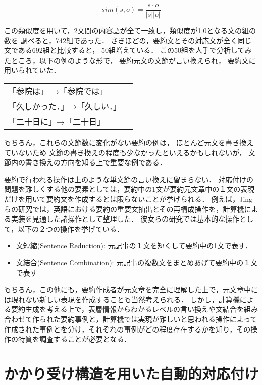 \begin{displaymath}
sim(s,o)=\frac{s \cdot o}{|s||o|}
\end{displaymath}


この類似度を用いて，2文間の内容語が全て一致し，類似度が1.0となる文の組の数を
調べると，742組であった．
さきほどの，要約文とその対応文が全く同じ文である692組と比較すると，
50組増えている．
この50組を人手で分析してみたところ，以下の例のような形で，
要約元文の文節が言い換えられ，
要約文に用いられていた．\\

\begin{center}
\small
\begin{tabular}{lp{}}
「参院は」 →「参院では」\\
「久しかった．」→「久しい．」\\
「二十日に」→「二十日」\\
\end{tabular}
\end{center}

もちろん，これらの文節数に変化がない要約の例は，
ほとんど元文を書き換えていないため
文節の書き換えの程度も少なかったといえるかもしれないが，
文節内の書き換えの方向を知る上で重要な例である．

要約で行われる操作は上のような単文節の言い換えに留まらない．
対応付けの問題を難しくする他の要素としては，要約中の1文が要約元文章中の１文の表現だけを用いて要約文を作成するとは限らないことが挙げられる．
例えば，Jingら\cite{Jing99}の研究では，英語における要約の重要文抽出とその再構成操作を，計算機による実装を見通した諸操作として整理した．
彼女らの研究では基本的な操作として，以下の２つの操作を挙げている．

\begin{itemize}
\item 文短縮(Sentence Reduction): 元記事の１文を短くして要約中の1文で表す．
\item 文結合(Sentence Combination): 元記事の複数文をまとめあげて要約中の１文で表す
\end{itemize}

もちろん，この他にも，要約作成者が元文章を完全に理解した上で，元文章中には現れない新しい表現を作成することも当然考えられる．
しかし，計算機による要約生成を考える上で，表層情報からわかるレベルの言い換えや文結合を組み合わせて作られた要約事例と，計算機では実現が難しいと思われる操作によって作成された事例とを分け，それぞれの事例がどの程度存在するかを知り，その操作の特質を調査することが必要となる．

\section{かかり受け構造を用いた自動的対応付け}


